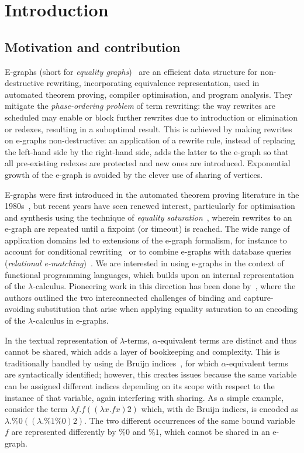 \section{Introduction}%
\label{sec:introduction}

\subsection{Motivation and contribution}

E-graphs (short for \emph{equality graphs})~\cite{EggPaper} are an efficient data structure for non-destructive rewriting, incorporating equivalence representation, used in automated theorem proving, compiler optimisation, and program analysis.
They mitigate the \emph{phase-ordering problem} of term rewriting: the way rewrites are scheduled may enable or block further rewrites due to introduction or elimination or redexes, resulting in a suboptimal result.
This is achieved by making rewrites on e-graphs non-destructive: an application of a rewrite rule, instead of replacing the left-hand side by the right-hand side, adds the latter to the e-graph so that all pre-existing redexes are protected and new ones are introduced.
Exponential growth of the e-graph is avoided by the clever use of sharing of vertices.

E-graphs were first introduced in the automated theorem proving literature in the 1980s~\cite{nelson1980techniques}, but recent years have seen renewed interest, particularly for optimisation and synthesis using the technique of \emph{equality saturation}~\cite{10.1145/1594834.1480915, flatt_small_2022, EggPaper,flatt_small_2022}, wherein rewrites to an e-graph are repeated until a fixpoint (or timeout) is reached.
The wide range of application domains led to extensions of the e-graph formalism, for instance to account for conditional rewriting~\cite{singher2023colored} or  to combine e-graphs with database queries (\emph{relational e-matching})~\cite{zhang_relational_2022}.
We are interested in using e-graphs in the context of functional programming languages, which builds upon an internal representation of the $\lambda$-calculus.
Pioneering work in this direction has been done by~\citet{koehler2022sketchguided}, where the authors outlined the two interconnected challenges of binding and capture-avoiding substitution that arise when applying equality saturation to an encoding of the $\lambda$-calculus in e-graphs.

In the textual representation of $\lambda$-terms, $\alpha$-equivalent terms are distinct and thus cannot be shared, which adds a layer of bookkeeping and complexity.
This is traditionally handled by using de Bruijn indices~\cite{de1972lambda}, for which $\alpha$-equivalent terms are syntactically identified; however, this creates issues because the same variable can be assigned different indices depending on its scope with respect to the instance of that variable, again interfering with sharing.
As a simple example, consider the term $\lambda f . f ((\lambda x . f x) 2)$ which, with de Bruijn indices,  is encoded as $\lambda . \%0 ((\lambda . \%1 \%0) 2)$.
The two different occurrences of the same bound variable $f$ are represented differently by $\%0$ and $\%1$, which cannot be shared in an e-graph.

